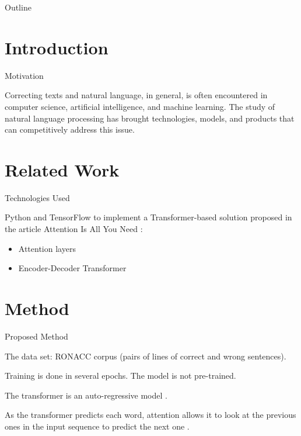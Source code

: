 \documentclass[]{beamer}
\begin{document}
    
    \begin{frame}{Outline}
        \tableofcontents
        
    \end{frame}
    
    \section{Introduction}
        
        \begin{frame}{Motivation}
            
            Correcting texts and natural language, in general, is often encountered in computer science, artificial intelligence, and machine learning. The study of natural language processing has brought technologies, models, and products that can competitively address this issue.
            
        \end{frame}
        
    \section{Related Work}
        
        \begin{frame}{Technologies Used}
            
            Python and TensorFlow to implement a Transformer-based solution proposed in the article Attention Is All You Need \cite{vaswani2017attention}:
            \begin{itemize}
                \item Attention layers
                \item Encoder-Decoder Transformer
            \end{itemize}
        
        \end{frame}
        
    \section{Method}
        
        \begin{frame}{Proposed Method}
            
            The data set: RONACC corpus (pairs of lines of correct and wrong sentences).
            
            Training is done in several epochs. The model is not pre-trained.
            
            The transformer is an auto-regressive model \cite{graves2013generating}.
            
            As the transformer predicts each word, attention allows it to look at the previous ones in the input sequence to predict the next one \cite{tensorflow2019transformer}.
        
        \end{frame}
        
\end{document}
